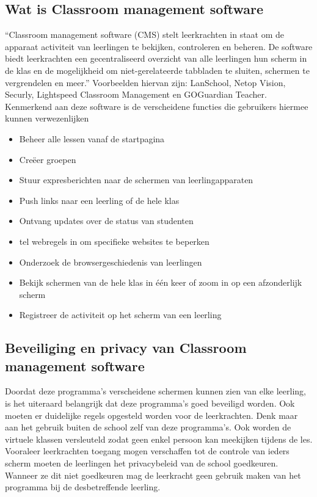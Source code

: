 \subsection{Wat is Classroom management software}
``Classroom management software (CMS) stelt leerkrachten in staat om de apparaat activiteit van leerlingen te bekijken, controleren en beheren. De software biedt leerkrachten een gecentraliseerd overzicht van alle leerlingen hun scherm in de klas en de mogelijkheid om niet-gerelateerde tabbladen te sluiten, schermen te vergrendelen en meer.'' \autocite{ClassroomManagement} 
Voorbeelden hiervan zijn: LanSchool, Netop Vision, Securly, Lightspeed Classroom Management en GOGuardian Teacher. 
Kenmerkend aan deze software is de verscheidene functies die gebruikers hiermee kunnen verwezenlijken
\begin{itemize}
    \item Beheer alle lessen vanaf de startpagina
    \item Creëer groepen 
    \item Stuur expresberichten naar de schermen van leerlingapparaten 
    \item Push links naar een leerling of de hele klas
    \item Ontvang updates over de status van studenten 
    \item tel webregels in om specifieke websites te beperken
    \item Onderzoek de browsergeschiedenis van leerlingen 
    \item Bekijk schermen van de hele klas in één keer of zoom in op een afzonderlijk scherm
    \item Registreer de activiteit op het scherm van een leerling
    \newline
    \autocite{Lightspeed}
\end{itemize}

\subsection{Beveiliging en privacy van Classroom management software}
Doordat deze programma's verscheidene schermen kunnen zien van elke leerling, is het uiteraard belangrijk dat deze programma's goed beveiligd worden. Ook moeten er duidelijke regels opgesteld worden voor de leerkrachten. Denk maar aan het gebruik buiten de school zelf van deze programma's. Ook worden de virtuele klassen versleuteld zodat geen enkel persoon kan meekijken tijdens de les. Vooraleer leerkrachten toegang mogen verschaffen tot de controle van ieders scherm moeten de leerlingen het privacybeleid van de school goedkeuren. Wanneer ze dit niet goedkeuren mag de leerkracht geen gebruik maken van het programma bij de desbetreffende leerling. \autocite{privacy}


